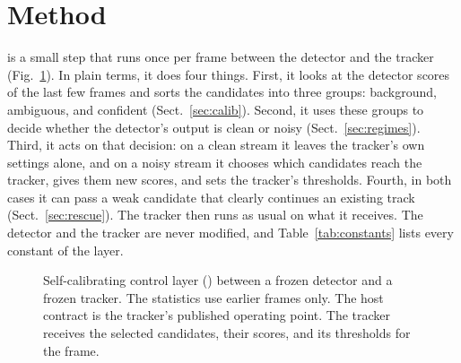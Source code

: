\section{Method}\label{sec:method}

\scl{} is a small step that runs once per frame between the detector and
the tracker (Fig.~\ref{fig:arch}). In plain terms, it does four things.
First, it looks at the detector scores of the last few frames and sorts the
candidates into three groups: background, ambiguous, and confident
(Sect.~\ref{sec:calib}). Second, it uses these groups to decide whether the
detector's output is clean or noisy (Sect.~\ref{sec:regimes}). Third, it
acts on that decision: on a clean stream it leaves the tracker's own settings
alone, and on a noisy stream it chooses which candidates reach the tracker,
gives them new scores, and sets the tracker's thresholds. Fourth, in both
cases it can pass a weak candidate that clearly continues an existing track
(Sect.~\ref{sec:rescue}). The tracker then runs as usual on what it receives.
The detector and the tracker are never modified, and
Table~\ref{tab:constants} lists every constant of the layer.

\begin{figure}[t]
\centering
{}
\caption{Self-calibrating control layer (\scl{}) between a frozen detector and a
frozen tracker. The statistics use earlier frames only. The host contract is the
tracker's published operating point. The tracker receives the selected
candidates, their scores, and its thresholds for the frame.}
\label{fig:arch}
\end{figure}

